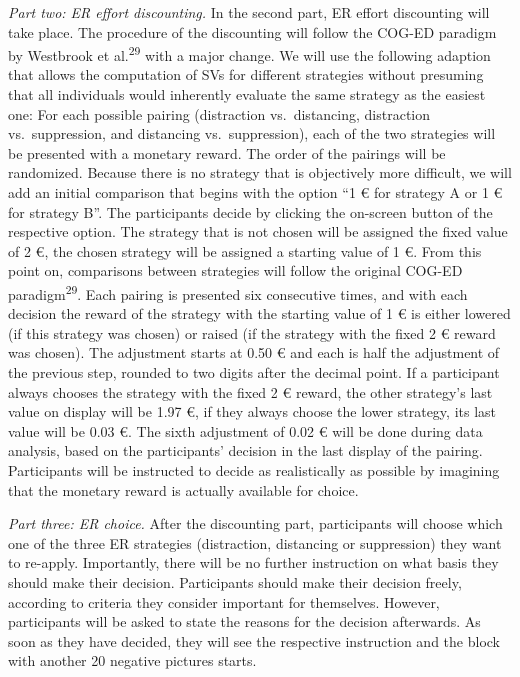 \documentclass[
  english,
  man,floatsintext]{apa6}
\begin{document}
\emph{Part two: ER effort discounting.} In the second part, ER effort discounting will take place.
The procedure of the discounting will follow the COG-ED paradigm by Westbrook et al.\textsuperscript{29} with a major change.
We will use the following adaption that allows the computation of SVs for different strategies without presuming that all individuals would inherently evaluate the same strategy as the easiest one: For each possible pairing (distraction vs.~distancing, distraction vs.~suppression, and distancing vs.~suppression), each of the two strategies will be presented with a monetary reward.
The order of the pairings will be randomized.
Because there is no strategy that is objectively more difficult, we will add an initial comparison that begins with the option ``1 € for strategy A or 1 € for strategy B''.
The participants decide by clicking the on-screen button of the respective option.
The strategy that is not chosen will be assigned the fixed value of 2 €, the chosen strategy will be assigned a starting value of 1 €.
From this point on, comparisons between strategies will follow the original COG-ED paradigm\textsuperscript{29}.
Each pairing is presented six consecutive times, and with each decision the reward of the strategy with the starting value of 1 € is either lowered (if this strategy was chosen) or raised (if the strategy with the fixed 2 € reward was chosen).
The adjustment starts at 0.50 € and each is half the adjustment of the previous step, rounded to two digits after the decimal point.
If a participant always chooses the strategy with the fixed 2 € reward, the other strategy's last value on display will be 1.97 €, if they always choose the lower strategy, its last value will be 0.03 €.
The sixth adjustment of 0.02 € will be done during data analysis, based on the participants' decision in the last display of the pairing.
Participants will be instructed to decide as realistically as possible by imagining that the monetary reward is actually available for choice.

\emph{Part three: ER choice.} After the discounting part, participants will choose which one of the three ER strategies (distraction, distancing or suppression) they want to re-apply.
Importantly, there will be no further instruction on what basis they should make their decision.
Participants should make their decision freely, according to criteria they consider important for themselves.
However, participants will be asked to state the reasons for the decision afterwards.
As soon as they have decided, they will see the respective instruction and the block with another 20 negative pictures starts.
\end{document}
